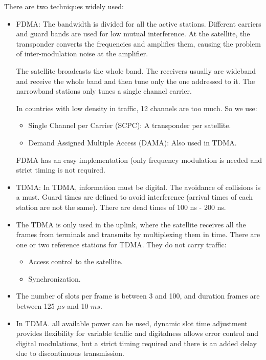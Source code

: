 \documentclass[
	12pt,
	twoside
]{book}
\begin{document}
There are two techniques widely used:
\begin{itemize}
	\item {
		FDMA: The bandwidth is divided for all the active stations. Different carriers and guard bands are used for low mutual interference. At the satellite, the transponder converts the frequencies and amplifies them, causing the problem of inter-modulation noise at the amplifier.

		The satellite broadcasts the whole band. The receivers usually are wideband and receive the whole band and then tune only the one addressed to it. The narrowband stations only tunes a single channel carrier.

		In countries with low density in traffic, 12 channels are too much. So we use:
		\begin{itemize}
			\item Single Channel per Carrier (SCPC): A transponder per satellite.
			\item Demand Assigned Multiple Access (DAMA): Also used in TDMA.
		\end{itemize}

		FDMA has an easy implementation (only frequency modulation is needed and strict timing is not required.
	}
	\item TDMA: In TDMA, information must be digital. The avoidance of collisions is a must. Guard times are defined to avoid interference (arrival times of each station are not the same). There are dead times of 100 ns - 200 ns.
	\item {
		The TDMA is only used in the uplink, where the satellite receives all the frames from terminals and transmits by multiplexing them in time. There are one or two reference stations for TDMA. They do not carry traffic:
		\begin{itemize}
			\item Access control to the satellite.
			\item Synchronization.
		\end{itemize}
	}
	\item The number of slots per frame is between 3 and 100, and duration frames are between 125 $\mu s$ and 10 $ms$.
	\item In TDMA. all available power can be used, dynamic slot time adjustment provides flexibility for variable traffic and digitalness allows error control and digital modulations, but a strict timing required and there is an added delay due to discontinuous transmission.
\end{itemize}
\end{document}
